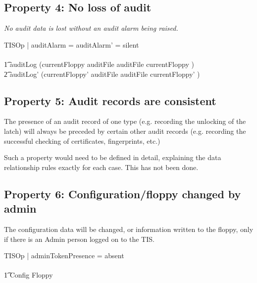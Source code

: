 \subsection{Property 4: No loss of audit}
\label{sec:AuditLossProp}
{\em No audit data is lost without an audit alarm being raised.
}

\begin{zed}
TISOp | auditAlarm = auditAlarm' = silent
\\ \shows
\\ \t1	auditLog \cup 	(\IF currentFloppy \in \ran auditFile
			\THEN auditFile \inv currentFloppy
			\ELSE \emptyset
			)
		\subseteq
\\ \t2	auditLog' \cup 	(\IF currentFloppy' \in \ran auditFile
			\THEN auditFile \inv currentFloppy'
			\ELSE \emptyset
			)
\end{zed}
\subsection{Property 5: Audit records are consistent}
\label{sec:AuditLinksProp}
The presence of an audit record of one type
(e.g. recording the unlocking of the latch)
will always be preceded by certain other audit records
(e.g. recording the successful checking of certificates, fingerprints, etc.)

Such a property would need to be defined in detail,
explaining the data relationship rules exactly for each case.
This has not been done.
\subsection{Property 6: Configuration/floppy changed by admin}
\label{sec:ConfigProp}
The configuration data will be changed,
or information written to the floppy,
only if there is an Admin person logged on to the TIS.

\begin{zed}
TISOp | adminTokenPresence = absent
\\ \shows
\\ \t1	\Xi Config \land \Xi Floppy
\end{zed}








